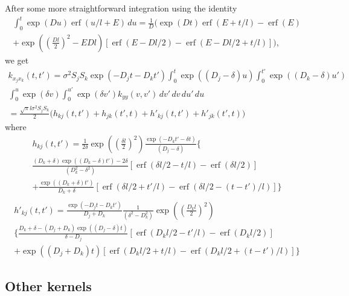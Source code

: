 \documentclass[a4paper]{article}
\newcommand{\erf}{\operatorname{erf}}
\begin{document}
After some more straightforward integration using the identity
\begin{multline}
  \label{eq:gpsim_identity}
  \int_0^t \exp(D u) \erf(u/l + E)\,du =
  \frac{1}{D} \bigg(
  \exp(Dt) \erf(E + t/l) - \erf(E) \\
  + \exp\left(\left( \frac{Dl}{2}\right)^2 -E Dl \right)
  [ \erf(E - Dl/2) - \erf(E-Dl/2+t/l) ]
  \bigg),
\end{multline}
we get
\begin{multline}
  k_{x_j x_k}(t, t') = \sigma^2 S_j S_k \exp(-D_j t - D_k t')
  \int_0^t \exp((D_j - \delta) u)
  \int_0^{t'} \exp((D_k - \delta) u') \\
  \int_0^u \exp(\delta v) \int_0^{u'} \exp(\delta v') k_{yy}(v, v') \, dv'\, dv\, du'\, du \\
  = \frac{\sqrt{\pi} l \sigma^2 S_j S_k}{2} \bigg(
  h_{kj}(t, t') + h_{jk}(t', t) 
  +
  h'_{kj}(t, t') + h'_{jk}(t', t)
  \bigg)
\end{multline}
where
\begin{multline}
  h_{kj}(t, t') = 
  \frac{1}{2\delta}\exp\left(\left(\frac{\delta l}{2}\right)^2\right)
  \frac{\exp(- D_k t' -\delta t)}{(D_j - \delta)}
  \bigg\{ 
   \\
  \frac{(D_k + \delta)\exp((D_k-\delta) t') - 2\delta}{(D_k^2-\delta^2)}
  [\erf(\delta l/2 - t/l) - \erf(\delta l/2)]
  \\
  + \frac{\exp((D_k+\delta)t')}{D_k+\delta}
  [\erf(\delta l/2 + t'/l)
  - \erf(\delta l/2 - (t-t')/l)]
  \bigg\} \\
\end{multline}
\begin{multline}
  h'_{kj}(t, t') = 
  \frac{\exp(-D_j t - D_k t')}{D_j + D_k}
  \frac{1}{(\delta^2 - D_k^2)}
  \exp\left(\left(\frac{D_k l}{2}\right)^2\right) \\
  \bigg\{
  \frac{D_k + \delta - (D_j + D_k) \exp((D_j - \delta) t)}
  {\delta - D_j} [\erf(D_k l/2 - t'/l) - \erf(D_k l/2)]
  \\
  + \exp((D_j + D_k) t)
  [\erf(D_k l/2 + t/l) - \erf(D_k l/2 + (t-t')/l)]
  \bigg\}
\end{multline}

\subsection{Other kernels}
\end{document}
